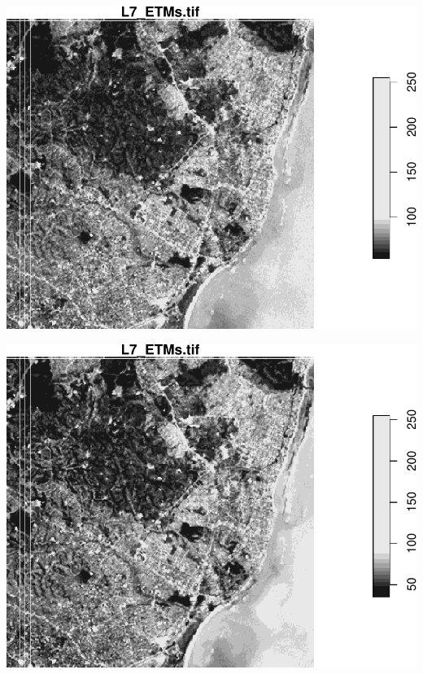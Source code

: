\documentclass[]{article}
\newenvironment{Shaded}{\begin{snugshade}}{\end{snugshade}}
\newcommand{\CommentTok}[1]{\textcolor[rgb]{0.56,0.35,0.01}{\textit{#1}}}
\newcommand{\DecValTok}[1]{\textcolor[rgb]{0.00,0.00,0.81}{#1}}
\newcommand{\NormalTok}[1]{#1}
\newcommand{\OperatorTok}[1]{\textcolor[rgb]{0.81,0.36,0.00}{\textbf{#1}}}
\newcommand{\StringTok}[1]{\textcolor[rgb]{0.31,0.60,0.02}{#1}}
\begin{document}
\includegraphics{R_tidyverse_for_geographers_files/figure-latex/unnamed-chunk-35-3.pdf}

\begin{Shaded}
\end{Shaded}

\includegraphics{R_tidyverse_for_geographers_files/figure-latex/unnamed-chunk-35-4.pdf}

\begin{Shaded}
\end{Shaded}
\end{document}
